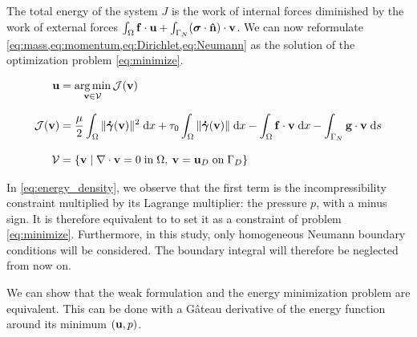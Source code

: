 \documentclass[11 pt]{report}
\begin{document}
The total energy of the system $J$ is the work of internal forces diminished by the work of external forces $\int_{\Omega} \mathbf{f} \cdot \mathbf{u} + \int_{\Gamma_N} (\boldsymbol \sigma \cdot \mathbf{\hat n}) \cdot \mathbf{v}$. We can now reformulate \cref{eq:mass,eq:momentum,eq:Dirichlet,eq:Neumann} as the solution of the optimization problem \eqref{eq:minimize}.
\begin{empheqboxed}
\begin{equation}
    \begin{aligned}
        \mathbf{u} &= \operatorname*{arg\,min}_{\mathbf{v} \in \mathcal{V}} \mathcal{J}(\mathbf{v})\\[8pt]
        \mathcal{J}(\mathbf{v}) &= \frac{\mu}{2}\int_{\Omega} \|\boldsymbol{\dot \gamma}(\mathbf{v})\|^2 \;\dd x + \tau_0 \int_{\Omega} \|\boldsymbol{\dot \gamma}(\mathbf{v})\| \;\dd x - \int_{\Omega} \mathbf{f}\cdot \mathbf{v} \; \dd x - \int_{\Gamma_N} \mathbf{g} \cdot \mathbf{v} \;\dd s\\[8pt]
        \mathcal{V} &= \{\mathbf{v} \;\vert\; \nabla \cdot \mathbf{v} = 0 \; \text{in} \; \Omega, \: \mathbf{v} = \mathbf{u}_{D} \;\text{on}\; \Gamma_D \}
    \end{aligned}\label{eq:minimize}
\end{equation}
\end{empheqboxed}

In \cref{eq:energy_density}, we observe that the first term is the incompressibility constraint multiplied by its Lagrange multiplier: the pressure $p$, with a minus sign. It is therefore equivalent to to set it as a constraint of problem \eqref{eq:minimize}. Furthermore, in this study, only homogeneous Neumann boundary conditions will be considered. The boundary integral will therefore be neglected from now on.

We can show that the weak formulation and the energy minimization problem are equivalent. This can be done with a Gâteau derivative of the energy function around its minimum $(\mathbf{u}, p)$.
\end{document}
